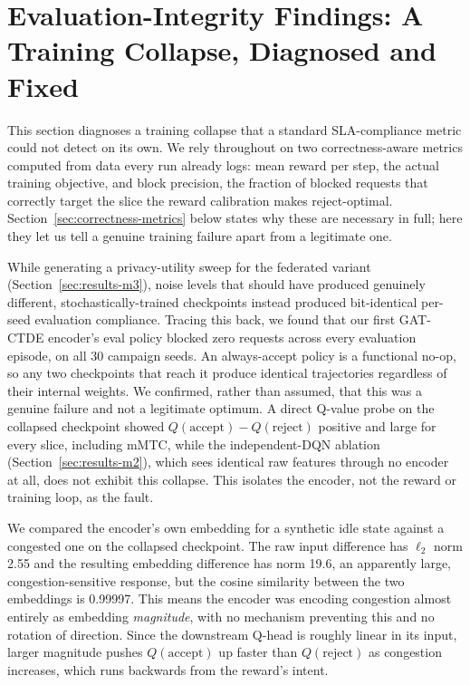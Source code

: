 \documentclass[pdflatex,sn-basic,Numbered]{sn-jnl}%
\begin{document}
\section{Evaluation-Integrity Findings: A Training Collapse, Diagnosed and Fixed}
\label{sec:collapse}
This section diagnoses a training collapse that a standard
SLA-compliance metric could not detect on its own. We rely throughout
on two correctness-aware metrics computed from data every run already
logs: mean reward per step, the actual training objective, and block
precision, the fraction of blocked requests that correctly target the
slice the reward calibration makes reject-optimal.
Section~\ref{sec:correctness-metrics} below states why these are
necessary in full; here they let us tell a genuine training failure
apart from a legitimate one.

While generating a privacy-utility sweep for the federated variant
(Section~\ref{sec:results-m3}), noise levels that should have produced
genuinely different, stochastically-trained checkpoints instead
produced bit-identical per-seed evaluation compliance. Tracing this back, we found that our first GAT-CTDE encoder's eval policy blocked zero requests across every evaluation episode, on all 30 campaign seeds. An always-accept policy is a functional no-op, so any two checkpoints that reach it produce identical trajectories regardless of their internal weights. We confirmed, rather than assumed, that this was a genuine failure and not a legitimate optimum. A direct Q-value probe on the collapsed checkpoint showed $Q(\text{accept}) - Q(\text{reject})$ positive and large for every slice, including mMTC, while the independent-DQN ablation (Section~\ref{sec:results-m2}), which sees identical raw features through no encoder at all, does not exhibit this collapse. This isolates the encoder, not the reward or training loop, as the fault.

We compared the encoder's own embedding for a synthetic idle state against a congested one on the collapsed checkpoint. The raw input difference has $\ell_2$ norm 2.55 and the resulting embedding difference has norm 19.6, an apparently large, congestion-sensitive response, but the cosine similarity between the two embeddings is 0.99997. This means the encoder was encoding congestion almost entirely as embedding \emph{magnitude}, with no mechanism preventing this and no rotation of direction. Since the downstream Q-head is roughly linear in its input, larger magnitude pushes $Q(\text{accept})$ up faster than $Q(\text{reject})$ as congestion increases, which runs backwards from the reward's intent.
\end{document}
